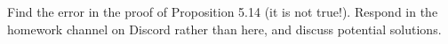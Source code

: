 \documentclass{article}
\begin{document}
\problem{}

Find the error in the proof of Proposition 5.14 (it is not true!).
Respond in the homework channel on Discord rather than here, and discuss potential solutions.

\problem{}
\end{document}

